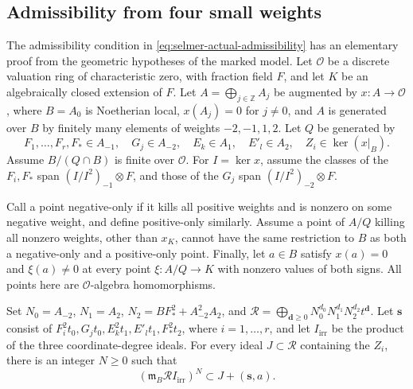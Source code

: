 \subsection{Admissibility from four small weights}
\label{subsec:selmer-admissibility}

The admissibility condition in \eqref{eq:selmer-actual-admissibility}
has an elementary proof from the geometric hypotheses of the marked
model. Let $\mathcal O$ be a discrete valuation ring of characteristic
zero, with fraction field $F$, and let $K$ be an algebraically closed
extension of $F$. Let $A=\bigoplus_{j\in\mathbb Z}A_j$ be augmented
by $x:A\to\mathcal O$, where $B=A_0$ is Noetherian local,
$x(A_j)=0$ for $j\ne0$, and $A$ is generated over $B$ by finitely
many elements of weights $-2,-1,1,2$.
Let $Q$ be generated by
\[
 F_1,\ldots,F_r,F_*\in A_{-1},\quad G_j\in A_{-2},\quad
 E_k\in A_1,\quad E'_l\in A_2,\quad Z_i\in\ker(x|_B).
\]
Assume $B/(Q\cap B)$ is finite over $\mathcal O$. For $I=\ker x$,
assume the classes of the $F_i,F_*$ span $(I/I^2)_{-1}\otimes F$,
and those of the $G_j$ span $(I/I^2)_{-2}\otimes F$.

Call a point negative-only if it kills all positive weights and is
nonzero on some negative weight, and define positive-only similarly.
Assume a point of $A/Q$ killing all nonzero weights, other than $x_K$,
cannot have the same restriction to $B$ as both a negative-only and a
positive-only point. Finally, let $a\in B$ satisfy $x(a)=0$ and
$\xi(a)\ne0$ at every point $\xi:A/Q\to K$ with nonzero values of
both signs. All points here are $\mathcal O$-algebra homomorphisms.

\begin{proposition}[Admissibility]
\label{prop:selmer-admissibility}
Set $N_0=A_{-2}$, $N_1=A_2$,
$N_2=BF_*^2+A_{-2}^2A_2$, and
$\mathcal R=\bigoplus_{\boldsymbol d\ge0}
N_0^{d_0}N_1^{d_1}N_2^{d_2}t^{\boldsymbol d}$.
Let $\boldsymbol s$ consist of
$F_i^2t_0,G_jt_0,E_k^2t_1,E'_lt_1,F_*^2t_2$, where
$i=1,\ldots,r$, and let $I_{\mathrm{irr}}$ be the product of the
three coordinate-degree ideals. For every ideal $J\subset\mathcal R$
containing the $Z_i$, there is an integer $N\ge0$ such that
\[
 (\mathfrak m_B\mathcal R I_{\mathrm{irr}})^N
 \subset J+(\boldsymbol s,a).
\]
\end{proposition}

